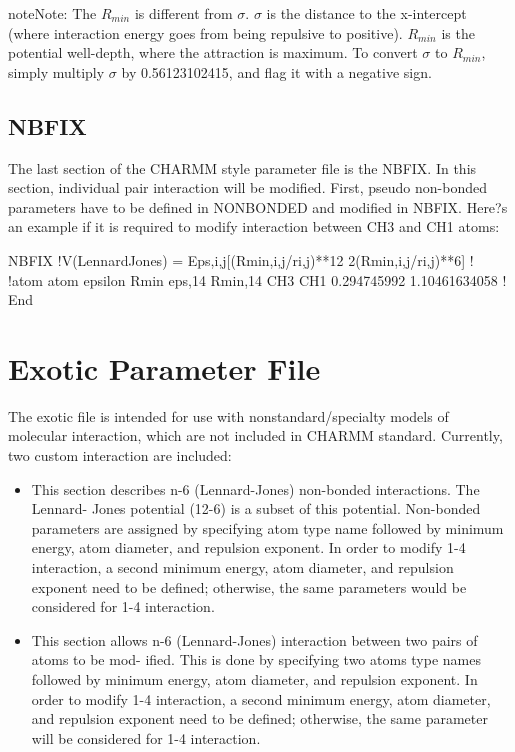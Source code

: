 \documentclass[letterpaper,10pt,english]{sphinxmanual}
\begin{document}
\begin{sphinxadmonition}{note}{Note:}
The \(R_{min}\) is different from \(\sigma\). \(\sigma\) is the distance to the x-intercept (where interaction energy goes from being repulsive to positive). \(R_{min}\) is the potential well-depth, where the attraction is maximum. To convert \(\sigma\) to \(R_{min}\), simply multiply \(\sigma\) by 0.56123102415, and flag it with a negative sign.
\end{sphinxadmonition}


\subsection{NBFIX}
\label{\detokenize{input_file:nbfix}}
The last section of the CHARMM style parameter file is the NBFIX. In this section, individual pair interaction will be modified. First, pseudo non-bonded parameters have to be defined in NONBONDED and modified in NBFIX. Here?s an example if it is required to modify interaction between CH3 and CH1 atoms:

%
\begin{sphinxVerbatim}[commandchars=\\\{\}]
NBFIX
!V(Lennard\PYGZhy{}Jones) = Eps,i,j[(Rmin,i,j/ri,j)**12 \PYGZhy{} 2(Rmin,i,j/ri,j)**6]
!
!atom atom epsilon Rmin eps,1\PYGZhy{}4 Rmin,1\PYGZhy{}4
CH3 CH1 \PYGZhy{}0.294745992 1.10461634058 !
End
\end{sphinxVerbatim}


\section{Exotic Parameter File}
\label{\detokenize{input_file:exotic-parameter-file}}
The exotic file is intended for use with nonstandard/specialty models of molecular interaction, which are not included in CHARMM standard. Currently, two custom interaction are included:
\begin{itemize}
\item {} 
 This section describes n-6 (Lennard-Jones) non-bonded interactions. The Lennard- Jones potential (12-6) is a subset of this potential. Non-bonded parameters are assigned by specifying atom type name followed by minimum energy, atom diameter, and repulsion exponent. In order to modify 1-4 interaction, a second minimum energy, atom diameter, and repulsion exponent need to be defined; otherwise, the same parameters would be considered for 1-4 interaction.

\item {} 
 This section allows n-6 (Lennard-Jones) interaction between two pairs of atoms to be mod- ified. This is done by specifying two atoms type names followed by minimum energy, atom diameter, and repulsion exponent. In order to modify 1-4 interaction, a second minimum energy, atom diameter, and repulsion exponent need to be defined; otherwise, the same parameter will be considered for 1-4 interaction.

\end{itemize}
\end{document}
